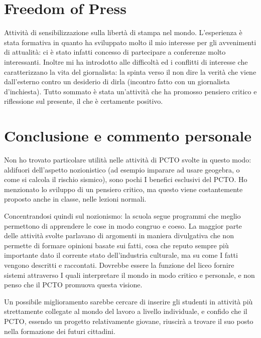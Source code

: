 \documentclass{article}
\begin{document}
   \section{Freedom of Press}
   Attività di sensibilizzazione sulla libertà di stampa nel mondo. L'esperienza è stata formativa in quanto ha sviluppato molto il mio interesse per gli avvenimenti di attualità: ci è stato infatti concesso di partecipare a conferenze molto interessanti. Inoltre mi ha introdotto alle difficoltà ed i conflitti di interesse che caratterizzano la vita del giornalista: la spinta verso il non dire la verità che viene dall'esterno contro un desiderio di dirla (incontro fatto con un giornalista d'inchiesta). Tutto sommato è stata un'attività che ha promosso pensiero critico e riflessione sul presente, il che è certamente positivo.

   \section{Conclusione e commento personale}
  Non ho trovato particolare utilità nelle attività di PCTO svolte in questo modo: aldifuori dell’aspetto nozionistico (ad esempio imparare ad usare geogebra, o come si calcola il rischio sismico), sono pochi I benefici esclusivi del PCTO. Ho menzionato lo sviluppo di un pensiero critico, ma questo viene costantemente proposto anche in classe, nelle lezioni normali. 

Concentrandosi quindi sul nozionismo: la scuola segue programmi che meglio permettono di apprendere le cose in modo congruo e coeso. La maggior parte delle attività svolte parlavano di argomenti in maniera divulgativa che non permette di formare opinioni basate sui fatti, cosa che reputo sempre più importante dato il corrente stato dell’industria culturale, ma su come I fatti vengono descritti e raccontati. Dovrebbe essere la funzione del liceo fornire sistemi attraverso I quali interpretare il mondo in modo critico e personale, e non penso che il PCTO promuova questa visione.

Un possibile miglioramento sarebbe cercare di inserire gli studenti in attività più strettamente collegate al mondo del lavoro a livello individuale, e confido che il PCTO, essendo un progetto relativamente giovane, riuscirà a trovare il suo posto nella formazione dei futuri cittadini.
\end{document}
